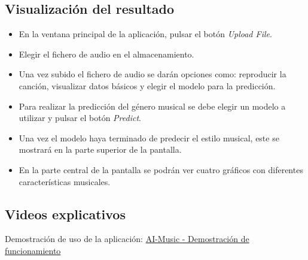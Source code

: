 

\subsection{Visualización del resultado}

\begin{itemize}
\tightlist

\item En la ventana principal de la aplicación, pulsar el botón \textit{Upload File}.
\item Elegir el fichero de audio en el almacenamiento.
\item Una vez subido el fichero de audio se darán opciones como: reproducir la canción, visualizar datos básicos y elegir el modelo para la predicción.
\item Para realizar la predicción del género musical se debe elegir un modelo a utilizar y pulsar el botón \textit{Predict}.
\item Una vez el modelo haya terminado de predecir el estilo musical, este se mostrará en la parte superior de la pantalla.
\item En la parte central de la pantalla se podrán ver cuatro gráficos con diferentes características musicales.

\end{itemize}





\subsection{Videos explicativos}

Demostración de uso de la aplicación: \href{https://www.youtube.com/watch?v=aX596dmo6Dk}{AI-Music - Demostración de funcionamiento}